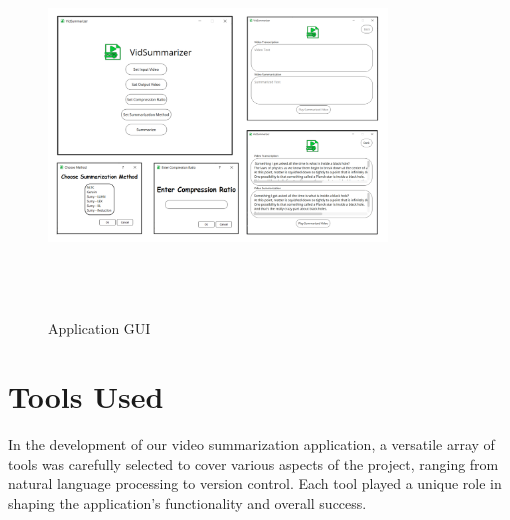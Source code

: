 \documentclass{ieeeaccess}
\begin{document}
\begin{figure}
    \centering
    \includegraphics[width=9cm, height=10cm, keepaspectratio]{GUI.png}
    \caption{Application GUI}
    \label{application_gui}
\end{figure} 

\section{Tools Used}
\label{tools_used}
In the development of our video summarization application, a versatile array of tools was carefully selected to cover various aspects of the project, ranging from natural language processing to version control. Each tool played a unique role in shaping the application's functionality and overall success.
\end{document}
